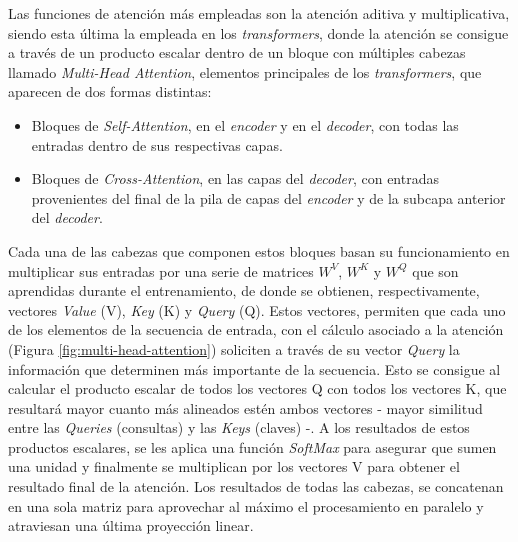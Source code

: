 Las funciones de atención más empleadas son la atención aditiva \cite{neuralmachinetranslationalignandtranslate} y multiplicativa, siendo esta última la empleada en los \textit{transformers}, donde la atención se consigue a través de un producto escalar dentro de un bloque con múltiples cabezas llamado \textit{Multi-Head Attention}, elementos principales de los \textit{transformers}, que aparecen de dos formas distintas:
\begin{itemize}
    \item Bloques de \textit{Self-Attention}, en el \textit{encoder} y en el \textit{decoder}, con todas las entradas dentro de sus respectivas capas.
    \item Bloques de \textit{Cross-Attention}, en las capas del \textit{decoder}, con entradas provenientes del final de la pila de capas del \textit{encoder} y de la subcapa anterior del \textit{decoder}.
\end{itemize}
Cada una de las cabezas que componen estos bloques basan su funcionamiento en multiplicar sus entradas por una serie de matrices $W^V$, $W^K$ y $W^Q$ que son aprendidas durante el entrenamiento, de donde se obtienen, respectivamente, vectores \textit{Value} (V), \textit{Key} (K) y \textit{Query} (Q). Estos vectores, permiten que cada uno de los elementos de la secuencia de entrada, con el cálculo asociado a la atención (Figura \ref{fig:multi-head-attention}) soliciten a través de su vector \textit{Query} la información que determinen más importante de la secuencia. Esto se consigue al calcular el producto escalar de todos los vectores Q con todos los vectores K, que resultará mayor cuanto más alineados estén ambos vectores - mayor similitud entre las \textit{Queries} (consultas) y las \textit{Keys} (claves) -. A los resultados de estos productos escalares, se les aplica una función \textit{SoftMax} para asegurar que sumen una unidad y finalmente se multiplican por los vectores V para obtener el resultado final de la atención. Los resultados de todas las cabezas, se concatenan en una sola matriz para aprovechar al máximo el procesamiento en paralelo y atraviesan una última proyección linear.

